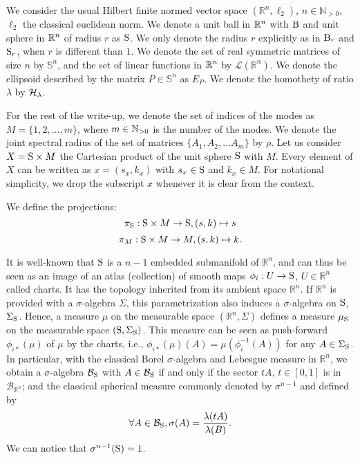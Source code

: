 We consider the usual Hilbert finite normed vector space $(\mathbb{R}^n,\ell_2)$, $n \in \mathbb{N}_{> 0}$, $\ell_2$ the classical euclidean norm. We denote a unit ball in $\mathbb{R}^n$ with $\text{B}$ and unit sphere in $\mathbb{R}^n$ of radius $r$ as $\text{S}$. We only denote the radius $r$ explicitly as in $\text{B}_r$ and $\text{S}_r$, when $r$ is different than $1$. We denote the set of real symmetric matrices of size $n$ by $\mathbb{S}^n$, and the set of linear functions in $\mathbb{R}^n$ by $\mathcal{L}(\mathbb{R}^n)$. We denote the ellipsoid described by the matrix $P \in \mathbb{S}^n$ as $E_P$. We denote the homothety of ratio $\lambda$ by $\mathcal{H}_{\lambda}$.

For the rest of the write-up, we denote the set of indices of the modes as $M = \{1,2,\dots,m\}$, where $m \in \mathbb{N}_{> 0}$ is the number of the modes. We denote the joint spectral radius of the set of matrices $\{A_1, A_2, \ldots A_m\}$ by $\rho$. Let us consider $X = \text{S} \times M$ the Cartesian product of the unit sphere $\text{S}$ with $M$. Every element of $X$ can be written as $x = (s_x, k_x)$ with $s_x \in \text{S}$ and $k_x \in M$. For notational simplicity, we drop the subscript $x$ whenever it is clear from the context.

We define the projections:
$$\pi_{\text{S}}: \text{S} \times M \rightarrow \text{S}, (s,k) \mapsto s$$
$$\pi_M: \text{S} \times M \rightarrow M, (s,k) \mapsto k.$$

It is well-known that $\text{S}$ is a $n-1$ embedded submanifold of $\mathbb{R}^n$, and can thus be seen as an image of an atlas (collection) of smooth maps $\phi_i: U \to \text{S}$, $U \in \mathbb{R}^n$ called charts. It has the topology inherited from its ambient space $\mathbb{R}^n$. If $\mathbb{R}^n$ is provided with a $\sigma$-algebra $\Sigma$, this parametrization also induces a $\sigma$-algebra on $\text{S}$, $\Sigma_{\text{S}}$. Hence, a measure $\mu$ on the measurable space $(\mathbb{R}^n, \Sigma)$ defines a measure $\mu_{\text{S}}$ on the measurable space $(\text{S}, \Sigma_{\text{S}})$. This measure can be seen as push-forward $\phi_{i*}(\mu)$ of $\mu$ by the charts, i.e., $\phi_{i*}(\mu)(A) = \mu(\phi_i^{-1}(A))$ for any $A \in \Sigma_{\text{S}}$. In particular, with the classical Borel $\sigma$-algebra and Lebesgue measure in $\mathbb{R}^n$, we obtain a $\sigma$-algebra $\mathcal{B}_{\text{S}}$ with $A \in \mathcal{B}_{\text{S}}$ if and only if the sector $t A$, $t \in [0,1]$ is in $\mathcal{B}_{\mathbb{R}^n}$; and the classical spherical measure commonly denoted by $\sigma^{n-1}$ and defined by
$$\forall A \in \mathcal{B}_{\text{S}}, \sigma(A) = \frac{\lambda(tA)}{\lambda(B)}. $$
We can notice that $\sigma^{n-1}(\text{S}) = 1$.

